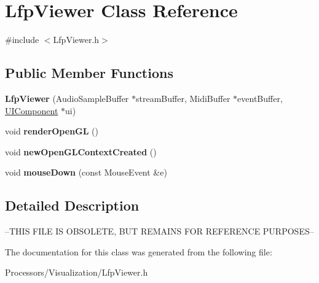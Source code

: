 \hypertarget{classLfpViewer}{\section{Lfp\-Viewer Class Reference}
\label{classLfpViewer}
}


{\ttfamily \#include $<$Lfp\-Viewer.\-h$>$}

\subsection*{Public Member Functions}
\begin{DoxyCompactItemize}
\item 
\hypertarget{classLfpViewer_a899a37851745963d4ee126916ec3fa92}{{\bfseries Lfp\-Viewer} (Audio\-Sample\-Buffer $\ast$stream\-Buffer, Midi\-Buffer $\ast$event\-Buffer, \hyperlink{classUIComponent}{U\-I\-Component} $\ast$ui)}\label{classLfpViewer_a899a37851745963d4ee126916ec3fa92}

\item 
\hypertarget{classLfpViewer_a13eebe7f519efd288b89e1842cad0dcb}{void {\bfseries render\-Open\-G\-L} ()}\label{classLfpViewer_a13eebe7f519efd288b89e1842cad0dcb}

\item 
\hypertarget{classLfpViewer_a800d1460152411ae80c65041583c8cf0}{void {\bfseries new\-Open\-G\-L\-Context\-Created} ()}\label{classLfpViewer_a800d1460152411ae80c65041583c8cf0}

\item 
\hypertarget{classLfpViewer_aefb6893bd17adea3d652dabe9b8b554e}{void {\bfseries mouse\-Down} (const Mouse\-Event \&e)}\label{classLfpViewer_aefb6893bd17adea3d652dabe9b8b554e}

\end{DoxyCompactItemize}


\subsection{Detailed Description}
--T\-H\-I\-S F\-I\-L\-E I\-S O\-B\-S\-O\-L\-E\-T\-E, B\-U\-T R\-E\-M\-A\-I\-N\-S F\-O\-R R\-E\-F\-E\-R\-E\-N\-C\-E P\-U\-R\-P\-O\-S\-E\-S-- 

The documentation for this class was generated from the following file\-:\begin{DoxyCompactItemize}
\item 
Processors/\-Visualization/Lfp\-Viewer.\-h\end{DoxyCompactItemize}
